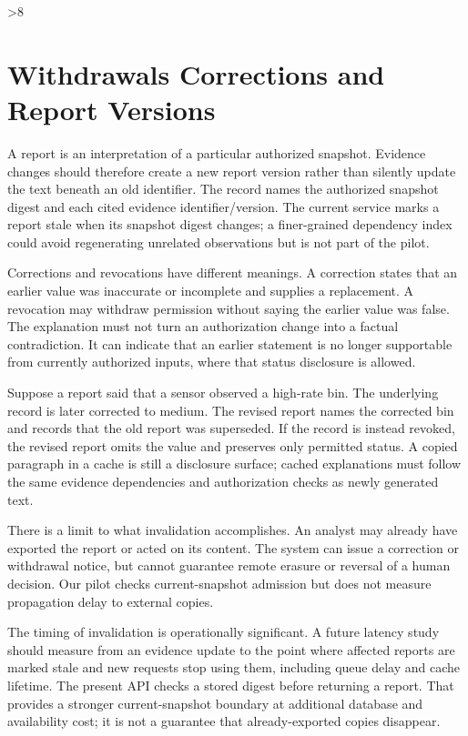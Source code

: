 \ifnum\variant>8
\section{Withdrawals Corrections and Report Versions}
A report is an interpretation of a particular authorized snapshot. Evidence changes should therefore create a new report version rather than silently update the text beneath an old identifier. The record names the authorized snapshot digest and each cited evidence identifier/version. The current service marks a report stale when its snapshot digest changes; a finer-grained dependency index could avoid regenerating unrelated observations but is not part of the pilot.

Corrections and revocations have different meanings. A correction states that an earlier value was inaccurate or incomplete and supplies a replacement. A revocation may withdraw permission without saying the earlier value was false. The explanation must not turn an authorization change into a factual contradiction. It can indicate that an earlier statement is no longer supportable from currently authorized inputs, where that status disclosure is allowed.

Suppose a report said that a sensor observed a high-rate bin. The underlying record is later corrected to medium. The revised report names the corrected bin and records that the old report was superseded. If the record is instead revoked, the revised report omits the value and preserves only permitted status. A copied paragraph in a cache is still a disclosure surface; cached explanations must follow the same evidence dependencies and authorization checks as newly generated text.

There is a limit to what invalidation accomplishes. An analyst may already have exported the report or acted on its content. The system can issue a correction or withdrawal notice, but cannot guarantee remote erasure or reversal of a human decision. Our pilot checks current-snapshot admission but does not measure propagation delay to external copies.

The timing of invalidation is operationally significant. A future latency study should measure from an evidence update to the point where affected reports are marked stale and new requests stop using them, including queue delay and cache lifetime. The present API checks a stored digest before returning a report. That provides a stronger current-snapshot boundary at additional database and availability cost; it is not a guarantee that already-exported copies disappear.

